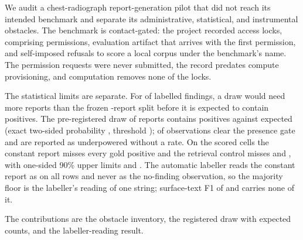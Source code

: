 
We audit a chest-radiograph report-generation pilot that did not reach its
intended benchmark and separate its administrative, statistical, and
instrumental obstacles. The benchmark is contact-gated: the project recorded
\NLocks{} access locks, comprising \NPermissionLocks{} permissions,
\NArtifactLocks{} evaluation artifact that arrives with the first permission,
and \NSubstitutionLocks{} self-imposed refusals to score a local corpus under
the benchmark's name. The permission requests were never submitted, the record
predates compute provisioning, and computation removes none of the locks.

The statistical limits are separate. For \NExceedSplit{} of \NFindings{}
labelled findings, a draw would need more reports than the frozen
\NTest{}-report split before it is expected to contain \MinPresent{} positives.
The pre-registered draw of \NCohort{} reports contains \SkewObserved{}
\SkewFinding{} positives against \SkewExpected{} expected (exact two-sided
probability \SkewP{}, threshold \Bonferroni{}); \NScored{} of \NFindings{}
observations clear the presence gate and \NUnderpowered{} are reported as
underpowered without a rate. On the scored cells the constant report misses
every gold positive and the retrieval control misses \RetMissedOne{} and
\RetMissedTwo{}, with one-sided 90\% upper limits \RetUpperOne{} and
\RetUpperTwo{}. The automatic labeller reads the constant report as
\MajAsserted{} on all \NCohort{} rows and never as the no-finding
observation, so the majority floor is the labeller's reading of one string;
surface-text F1 of \SurfaceRetrievalF{} and \SurfaceMajorityF{} carries none
of it.

The contributions are the obstacle inventory, the registered draw with
expected counts, and the labeller-reading result.
